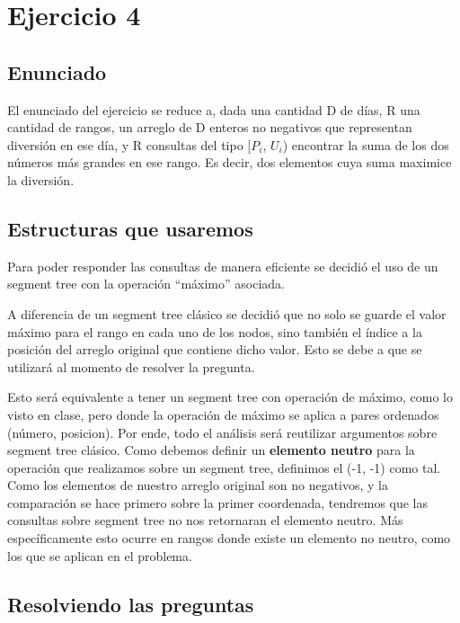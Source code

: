 \section{Ejercicio 4}
\subsection{Enunciado}
El enunciado del ejercicio se reduce a, dada una cantidad D de días, R una cantidad de rangos, un arreglo
de D enteros no negativos que representan diversión en ese día, y R consultas del tipo [$P_i$, $U_i$) encontrar
la suma de los dos números más grandes en ese rango. Es decir, dos elementos cuya suma maximice la diversión.

\subsection{Estructuras que usaremos}

Para poder responder las consultas de manera eficiente se decidió el uso de un segment tree con la operación ``máximo'' asociada.\newline

A diferencia de un segment tree clásico se decidió que no solo se guarde el valor máximo para el rango en cada uno de los nodos, sino también el índice a la posición del arreglo original que contiene dicho valor. Esto se debe a que se utilizará al momento de resolver la pregunta.  \newline

\par{
Esto será equivalente a tener un segment tree con operación de máximo, como lo visto en clase, pero donde la operación de máximo se aplica a pares ordenados (número, posicion).
Por ende, todo el análisis será reutilizar argumentos sobre segment tree clásico. 
Como debemos definir un \textbf{elemento neutro} para la operación que realizamos sobre un segment tree, definimos
el (-1, -1) como tal. Como los elementos de nuestro arreglo original son no negativos, y la comparación se hace primero sobre la primer coordenada, tendremos que las consultas sobre segment tree no nos
retornaran el elemento neutro. Más específicamente esto ocurre en rangos donde existe un elemento no neutro, como los que se aplican en el problema.
}

\subsection{Resolviendo las preguntas}

